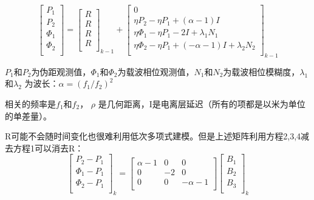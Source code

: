 \begin{equation}
	\begin{bmatrix}
		P_{1}\\
		P_{2}\\
		\Phi_{1}\\
		\Phi_{2}\\
	\end{bmatrix}
	=\begin{bmatrix}
		R\\
		R\\
		R\\
		R\\
	\end{bmatrix}_{k-1}
	+
	\begin{bmatrix}
		0\\
		\eta P_{2}-\eta P_{1}+(\alpha-1)I\\
		\eta \Phi_{1}-\eta P_{1}-2I+\lambda_{1}N_{1}\\
		\eta \Phi_{2}-\eta P_{1}+(-\alpha-1)I+\lambda_{2}N_{2}\\
	\end{bmatrix}_{k-1}
\end{equation}

$P_{1}$和$P_{2}$为伪距观测值，$\Phi_{1}$和$\Phi_{2}$为载波相位观测值，$N_{1}$和$N_{2}$为载波相位模糊度，$\lambda_{1}$和$\lambda_{2}$ 为波长：$\alpha=(f_{1}/f_{2})^{2}$

相关的频率是$f_{1}$和$f_{2}$， $\rho$ 是几何距离，I是电离层延迟（所有的项都是以米为单位的单差量）。

R可能不会随时间变化也很难利用低次多项式建模。但是上述矩阵利用方程2,3,4减去方程1可以消去R：
\begin{equation}
	\begin{bmatrix}
		P_{2}-P_{1}\\
		\Phi_{1}-P_{1}\\
		\Phi_{2}-P_{1}\\
	\end{bmatrix}_{k}
	=\begin{bmatrix}
		\alpha-1&0&0\\
		0&-2&0\\
		0&0&-\alpha-1\\
	\end{bmatrix}
	\begin{bmatrix}
		B_{1}\\
		B_{2}\\
		B_{3}\\
	\end{bmatrix}_{k}
\end{equation}

